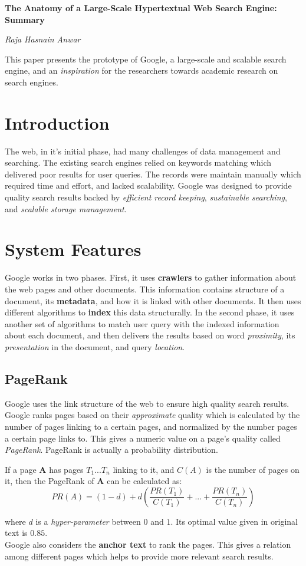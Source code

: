 \documentclass[a4paper, 10pt]{article}
\begin{document}
\noindent
\begin{center}
      \huge\textbf{The Anatomy of a Large-Scale Hypertextual Web Search Engine: Summary}\\
\end{center}
\hfill \Large\textit{Raja Hasnain Anwar}
\begin{center}
This paper presents the prototype of Google, a large-scale and scalable search engine, and  an \textit{inspiration} for the researchers towards academic research on search engines.
\end{center}
\section{Introduction}
The web, in it's initial phase, had many challenges of data management and searching. The existing search engines relied on keywords matching which delivered poor results for user queries. The records were maintain manually which required time and effort, and lacked scalability. Google was designed to provide quality search results backed by \textit{efficient record keeping}, \textit{sustainable searching}, and \textit{scalable storage management}.
\section{System Features}
Google works in two phases. First, it uses \textbf{crawlers} to gather information about the web pages and other documents. This information contains structure of a document, its \textbf{metadata}, and how it is linked with other documents. It then uses different algorithms to \textbf{index} this data structurally. In the second phase, it uses another set of algorithms to match user query with the indexed information about each document, and then delivers the results based on word \textit{proximity}, its \textit{presentation} in the document, and query \textit{location}.
\subsection{PageRank}
Google uses the link structure of the web to ensure high quality search results. Google ranks pages based on their \textit{approximate} quality which is calculated by the number of pages linking to a certain pages, and normalized by the number pages a certain page links to. This gives a numeric value on a page's quality called \textit{PageRank}. PageRank is actually a probability distribution.
\begin{center}
If a page \textbf{A} has pages \(T_{1} ... T_{n}\) linking to it, and \(C(A)\) is the number of pages on it, then the PageRank of \textbf{A} can be calculated as:
\[PR(A) = (1-d) + d(\frac{PR(T_{1})}{C(T_{1})} + ... + \frac{PR(T_{n})}{C(T_{n})})\]
\end{center}
{\small where \(d\) is a \textit{hyper-parameter} between \(0\) and \(1\). Its optimal value given in original text is \(0.85\).}\\
Google also considers the \textbf{anchor text} to rank the pages. This gives a relation among different pages which helps to provide more relevant search results.
\end{document}
